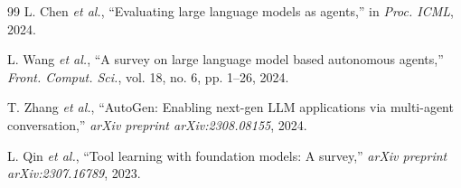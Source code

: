 \documentclass{ieeeaccess}
\begin{document}
\begin{thebibliography}{99}
L. Chen \emph{et al.}, ``Evaluating large language models as agents,'' in \emph{Proc. ICML}, 2024.

L. Wang \emph{et al.}, ``A survey on large language model based autonomous agents,'' \emph{Front. Comput. Sci.}, vol. 18, no. 6, pp. 1--26, 2024.

T. Zhang \emph{et al.}, ``AutoGen: Enabling next-gen LLM applications via multi-agent conversation,'' \emph{arXiv preprint arXiv:2308.08155}, 2024.

L. Qin \emph{et al.}, ``Tool learning with foundation models: A survey,'' \emph{arXiv preprint arXiv:2307.16789}, 2023.

\end{thebibliography}

\EOD
\end{document}

